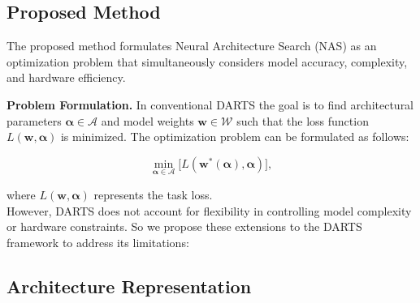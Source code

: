 \documentclass{article}
\begin{document}

\subsection{Proposed Method}
The proposed method formulates Neural Architecture Search (NAS) as an optimization problem that simultaneously considers model accuracy, complexity, and hardware efficiency.  %

\textbf{Problem Formulation.} In conventional DARTS the goal is to find architectural parameters \(\boldsymbol{\alpha} \in \mathcal{A}\) and model weights \(\boldsymbol{w} \in \mathcal{W}\) such that the loss function \(L(\boldsymbol{w}, \boldsymbol{\alpha})\) is minimized. The optimization problem can be formulated as follows:

\[
\min_{\boldsymbol{\alpha} \in \mathcal{A}} \big[L(\boldsymbol{w}^*(\boldsymbol{\alpha}), \boldsymbol{\alpha}) \big],
\]

where \(L(\boldsymbol{w}, \boldsymbol{\alpha})\) represents the task loss.  \\
However, DARTS does not account for flexibility in controlling model complexity or hardware constraints. So we propose these extensions to the DARTS framework to address its limitations:


\subsection{Architecture Representation}
\end{document}
